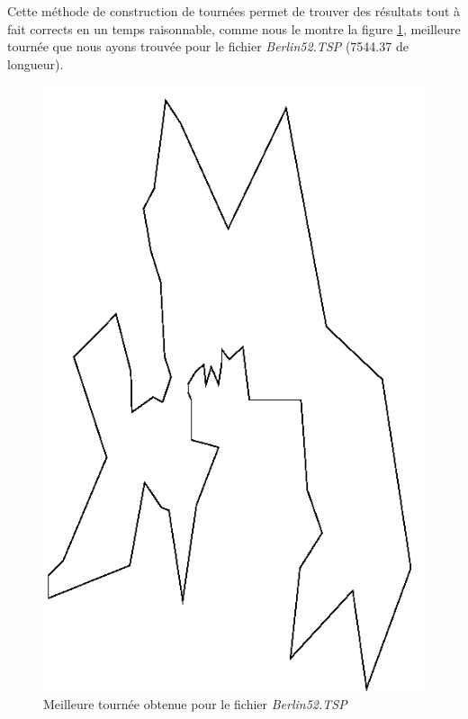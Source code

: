 \documentclass[a4paper, 11pt]{article}
\begin{document}
{	Cette méthode de construction de tournées permet de trouver des résultats tout à fait corrects en un temps raisonnable, comme nous le montre la figure \ref{fig:4}, meilleure tournée que nous ayons trouvée pour le fichier \textit{Berlin52.TSP} (7544.37 de longueur).

\begin{figure}[H]
   \begin{center}
      \includegraphics[width=14cm]{../images/4.png}
   \end{center}
   \caption{Meilleure tournée obtenue pour le fichier \textit{Berlin52.TSP}}
	\label{fig:4}
\end{figure}

}
\end{document}
